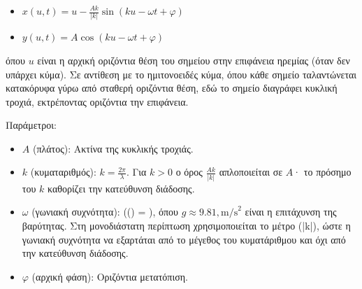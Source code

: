 \begin{itemize}
\tightlist
\item
  \(x(u, t) = u - \frac{A k}{|k|} \sin(k u - \omega t + \varphi)\)
\item
  \(y(u, t) = A \cos(k u - \omega t + \varphi)\)
\end{itemize}

όπου \(u\) είναι η αρχική οριζόντια θέση του σημείου στην επιφάνεια
ηρεμίας (όταν δεν υπάρχει κύμα). Σε αντίθεση με το ημιτονοειδές κύμα,
όπου κάθε σημείο ταλαντώνεται κατακόρυφα γύρω από σταθερή οριζόντια
θέση, εδώ το σημείο διαγράφει κυκλική τροχιά, εκτρέποντας οριζόντια την
επιφάνεια.

Παράμετροι:

\begin{itemize}
\tightlist
\item
  \(A\) (πλάτος): Ακτίνα της κυκλικής τροχιάς.
\item
  \(k\) (κυματαριθμός): \(k = \frac{2\pi}{\lambda}\). Για \(k>0\) ο όρος
  \(\frac{A k}{|k|}\) απλοποιείται σε \(A\)· το πρόσημο του \(k\)
  καθορίζει την κατεύθυνση διάδοσης.
\item
  \(\omega\) (γωνιακή συχνότητα): (\omega() = ),
όπου \(g\approx 9.81,\text{m/s}^2\) είναι η επιτάχυνση της βαρύτητας.
Στη μονοδιάστατη περίπτωση χρησιμοποιείται το μέτρο (|k|), ώστε η
γωνιακή συχνότητα να εξαρτάται από το μέγεθος του κυματάριθμου και όχι
από την κατεύθυνση διάδοσης.
\item
  \(\varphi\) (αρχική φάση): Οριζόντια μετατόπιση.
\end{itemize}


